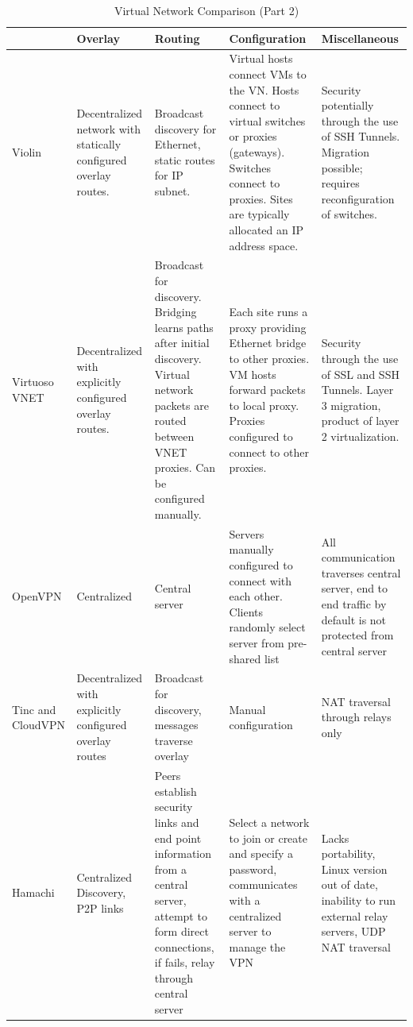 \begin{table}[ht]
\caption{Virtual Network Comparison (Part 2)}
\label{tab:virtual_networks_part2}
{\small
\centering
\begin{tabular}{|p{.8in}||p{1.25in}|p{1.25in}|p{1.25in}|p{1.25in}|} \hline
& Overlay & Routing & Configuration & Miscellaneous \\ \hline\hline
Violin
&
Decentralized network with statically configured overlay routes.
&
Broadcast discovery for Ethernet, static routes for IP subnet.
&
Virtual hosts connect VMs to the VN.  Hosts connect to virtual switches or
proxies (gateways).  Switches connect to proxies.  Sites are typically
allocated an IP address space.
&
Security potentially through the use of SSH Tunnels.  Migration possible;
requires reconfiguration of switches. 
\\ \hline
Virtuoso VNET
&
Decentralized with explicitly configured overlay routes.
&
Broadcast for discovery.  Bridging learns paths after initial discovery.  Virtual
network packets are routed between VNET proxies.  Can be configured manually.
&
Each site runs a proxy providing Ethernet bridge to other proxies.  VM hosts
forward packets to local proxy.  Proxies configured to connect to other proxies.
&
Security through the use of SSL and SSH Tunnels.  Layer 3 migration, product of
layer 2 virtualization.
\\ \hline
OpenVPN
&
Centralized
&
Central server
&
Servers manually configured to connect with each other.  Clients randomly select
server from pre-shared list
&
All communication traverses central server, end to end traffic by default is not
protected from central server
\\ \hline
Tinc and CloudVPN
&
Decentralized with explicitly configured overlay routes
&
Broadcast for discovery, messages traverse overlay
&
Manual configuration
&
NAT traversal through relays only
\\ \hline
Hamachi
&
Centralized Discovery, P2P links
&
Peers establish security links and end point information from a central
server, attempt to form direct connections, if fails, relay through central
server
&
Select a network to join or create and specify a password, communicates with a
centralized server to manage the VPN
&
Lacks portability, Linux version out of date, inability to run external relay
servers, UDP NAT traversal
\\ \hline
\end{tabular}
}
\end{table}

